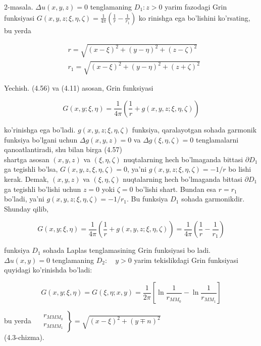 \documentclass[10pt]{article}
\begin{document}
2-masala. $\Delta u(x, y, z)=0$ tenglamaning $D_{1}: z>0$ yarim fazodagi Grin funksiyasi $G(x, y, z ; \xi, \eta, \zeta)=\frac{1}{4 \pi}\left(\frac{1}{r}-\frac{1}{r_{1}}\right)$ ko rinishga ega bo'lishini ko'rsating, bu yerda


\begin{align*}
& r=\sqrt{(x-\xi)^{2}+(y-\eta)^{2}+(z-\zeta)^{2}} \\
& r_{1}=\sqrt{(x-\xi)^{2}+(y-\eta)^{2}+(z+\zeta)^{2}} \tag{4.2-chizma}
\end{align*}


Yechish. (4.56) va (4.11) asosan, Grin funksiyasi

$$
G(x, y ; \xi, \eta)=\frac{1}{4 \pi}\left(\frac{1}{r}+g(x, y, z ; \xi, \eta, \zeta)\right)
$$

ko'rinishga ega bo'ladi. $g(x, y, z ; \xi, \eta, \zeta)$ funksiya, qaralayotgan sohada garmonik funksiya bo'lgani uchun $\Delta g(x, y, z)=0$ va $\Delta g(\xi, \eta, \zeta)=0$ tenglamalarni qanoatlantiradi, shu bilan birga (4.57)\\
shartga asosan $(x, y, z)$ va $(\xi, \eta, \zeta)$ nuqtalarning hech bo'lmaganda bittasi $\partial D_{1}$ ga tegishli bo'lsa, $G(x, y, z, \xi, \eta, \zeta)=0$, ya'ni $g(x, y, z ; \xi, \eta, \zeta)=-1 / r$ bo lishi kerak. Demak, $(x, y, z)$ va $(\xi, \eta, \zeta)$ nuqtalarning hech bo'lmaganda bittasi $\partial D_{1}$ ga tegishli bo'lishi uchun $z=0$ yoki $\zeta=0$ bo'lishi shart. Bundan esa $r=r_{1}$ bo'ladi, ya'ni $g(x, y, z ; \xi, \eta, \zeta)=-1 / r_{1}$. Bu funksiya $D_{1}$ sohada garmonikdir. Shunday qilib,

$$
G(x, y ; \xi, \eta)=\frac{1}{4 \pi}\left(\frac{1}{r}+g(x, y, z ; \xi, \eta, \zeta)\right)=\frac{1}{4 \pi}\left(\frac{1}{r}-\frac{1}{r_{1}}\right)
$$

funksiya $D_{1}$ sohada Laplas tenglamasining Grin funksiyasi bo ladi.\\
$\Delta u(x, y)=0$ tenglamaning $D_{2}: \quad y>0$ yarim tekislikdagi Grin funksiyasi quyidagi ko'rinishda bo'ladi:


\begin{equation*}
G(x, y ; \xi, \eta)=G(\xi, \eta ; x, y)=\frac{1}{2 \pi}\left[\ln \frac{1}{r_{M M_{0}}}-\ln \frac{1}{r_{M M_{1}}}\right] \tag{4.67}
\end{equation*}


bu yerda $\left.\quad \begin{array}{c}r_{M M M_{0}} \\ r_{M M M_{1}}\end{array}\right\}=\sqrt{(x-\xi)^{2}+(y \mp n)^{2}}$\\
(4.3-chizma).
\end{document}
